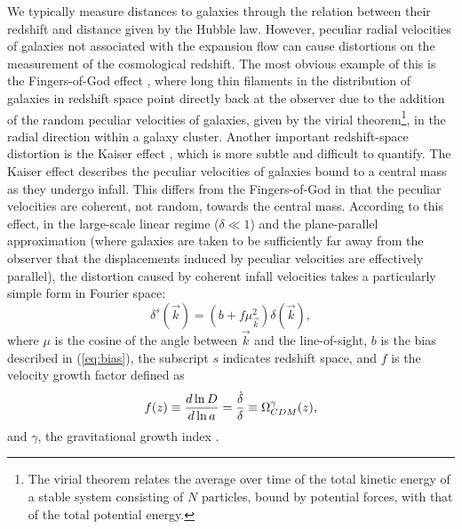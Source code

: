 We typically measure distances to galaxies through the relation between their redshift and distance given by the Hubble law. However, peculiar radial velocities of galaxies not associated with the expansion flow can cause distortions on the measurement of the cosmological redshift. The most obvious example of this is the Fingers-of-God effect \citep{Bahcall1986}, where long thin filaments in the distribution of galaxies in redshift space point directly back at the observer due to the addition of the random peculiar velocities of galaxies, given by the virial theorem\footnote{The virial theorem relates the average over time of the total kinetic energy of a stable system consisting of $N$ particles, bound by potential forces, with that of the total potential energy.}, in the radial direction within a galaxy cluster. Another important redshift-space distortion is the Kaiser effect \citep{Kaiser1984}, which is more subtle and difficult to quantify. The Kaiser effect describes the peculiar velocities of galaxies bound to a central mass as they undergo infall. This differs from the Fingers-of-God in that the peculiar velocities are coherent, not random, towards the central mass. According to this effect, in the large-scale linear regime ($\delta \ll 1$) and the plane-parallel approximation (where galaxies are taken to be sufficiently far away from the observer that the displacements induced by peculiar velocities are effectively parallel), the distortion caused by coherent infall velocities takes a particularly simple form in Fourier space:
\begin{equation}
\delta^s(\vec{k})=(b+f\mu^2_{\vec{k}})\delta(\vec{k}),
\label{eq:kaiser}
\end{equation}
where $\mu$ is the cosine of the angle between $\vec{k}$ and the line-of-sight, $b$ is the bias described in (\ref{eq:bias}), the subscript $s$ indicates redshift space, and $f$ is the velocity growth factor defined as
\begin{equation}
f(z)\equiv{d\ln D \over d \ln a}={\dot{\delta} \over \delta}\equiv\Omega_{CDM}^\gamma(z),
\end{equation}
and $\gamma$, the gravitational growth index \citep{Linder2008}.

